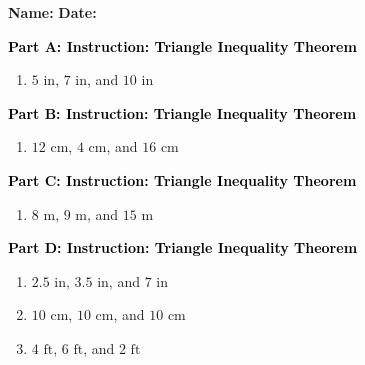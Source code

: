 \documentclass[12pt, letterpaper, fleqn]{article}
\begin{document}
\textbf{Name:} \underline{\hspace{5cm}}
\hfill
\textbf{Date:} \underline{\hspace{3cm}}\\

\begin{tcolorbox}[colback=customteal!20]
\large\textcolor{black}{\textbf{Part A: Instruction: Triangle Inequality Theorem}}
\end{tcolorbox}

\vspace{3mm}

\begin{enumerate}[itemsep=2.2cm, leftmargin=0.6cm]
\item $5\text{ in}$, $7\text{ in}$, and $10\text{ in}$
\end{enumerate}

\newpage

\begin{tcolorbox}[colback=customteal!20]
\large\textcolor{black}{\textbf{Part B: Instruction: Triangle Inequality Theorem}}
\end{tcolorbox}

\vspace{3mm}

\begin{enumerate}[itemsep=2.2cm, leftmargin=0.6cm, resume]
\item $12\text{ cm}$, $4\text{ cm}$, and $16\text{ cm}$
\end{enumerate}

\newpage

\begin{tcolorbox}[colback=customteal!20]
\large\textcolor{black}{\textbf{Part C: Instruction: Triangle Inequality Theorem}}
\end{tcolorbox}

\vspace{3mm}

\begin{enumerate}[itemsep=2.2cm, leftmargin=0.6cm, resume]
\item $8\text{ m}$, $9\text{ m}$, and $15\text{ m}$
\end{enumerate}

\newpage

\begin{tcolorbox}[colback=customteal!20]
\large\textcolor{black}{\textbf{Part D: Instruction: Triangle Inequality Theorem}}
\end{tcolorbox}

\vspace{3mm}

\begin{enumerate}[itemsep=2.2cm, leftmargin=0.6cm, resume]
\item $2.5\text{ in}$, $3.5\text{ in}$, and $7\text{ in}$
\item $10\text{ cm}$, $10\text{ cm}$, and $10\text{ cm}$
\item $4\text{ ft}$, $6\text{ ft}$, and $2\text{ ft}$
\end{enumerate}
\end{document}
